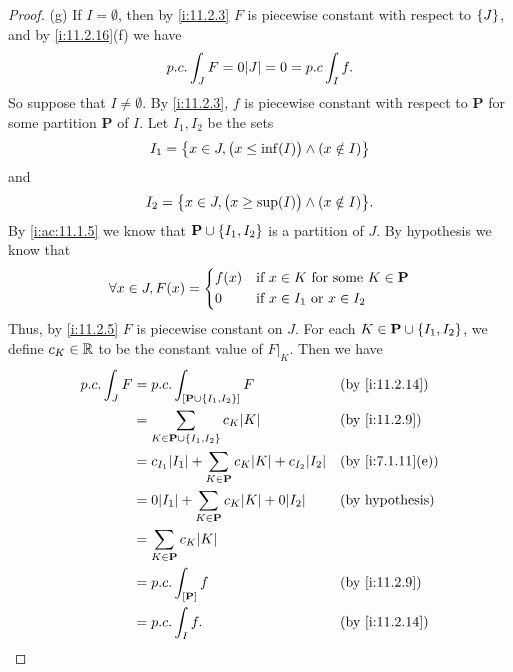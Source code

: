 \begin{proof}{(g)}
  If \(I = \emptyset\), then by \cref{i:11.2.3} \(F\) is piecewise constant with respect to \(\left\lbrace J\right\rbrace\), and by \cref{i:11.2.16}(f) we have
  \[
    p.c. \int_J F = 0 \abs{J} = 0 = p.c \int_I f.
  \]
  So suppose that \(I \neq \emptyset\).
  By \cref{i:11.2.3}, \(f\) is piecewise constant with respect to \(\mathbf{P}\) for some partition \(\mathbf{P}\) of \(I\).
  Let \(I_1, I_2\) be the sets
  \[
    I_1 = \left\lbrace x \in J, \big(x \leq \inf(I)\big) \land (x \notin I)\right\rbrace
  \]
  and
  \[
    I_2 = \set{x \in J, \big(x \geq \sup(I)\big) \land (x \notin I)}.
  \]
  By \cref{i:ac:11.1.5} we know that \(\mathbf{P} \cup \left\lbrace I_1, I_2\right\rbrace\) is a partition of \(J\).
  By hypothesis we know that
  \[
    \forall x \in J, F(x) = \begin{dcases}
      f(x) & \text{if } x \in K \text{ for some } K \in \mathbf{P} \\
      0    & \text{if } x \in I_1 \text{ or } x \in I_2
    \end{dcases}
  \]
  Thus, by \cref{i:11.2.5} \(F\) is piecewise constant on \(J\).
  For each \(K \in \mathbf{P} \cup \left\lbrace I_1, I_2\right\rbrace\), we define \(c_K \in \mathbb{R}\) to be the constant value of \(F|_K\).
  Then we have
  \begin{align*}
    p.c. \int_J F & = p.c. \int_{[\mathbf{P} \cup \set{I_1, I_2}]} F                              &  & \by{i:11.2.14}         \\
                  & = \sum_{K \in \mathbf{P} \cup \set{I_1, I_2}} c_K \abs{K}                     &  & \by{i:11.2.9}          \\
                  & = c_{I_1} \abs{I_1} + \sum_{K \in \mathbf{P}} c_K \abs{K} + c_{I_2} \abs{I_2} &  & \by{i:7.1.11}[e]       \\
                  & = 0 \abs{I_1} + \sum_{K \in \mathbf{P}} c_K \abs{K} + 0 \abs{I_2}             &  & \text{(by hypothesis)} \\
                  & = \sum_{K \in \mathbf{P}} c_K \abs{K}                                                                     \\
                  & = p.c. \int_{[\mathbf{P}]} f                                                  &  & \by{i:11.2.9}          \\
                  & = p.c. \int_I f.                                                              &  & \by{i:11.2.14}
  \end{align*}
\end{proof}

